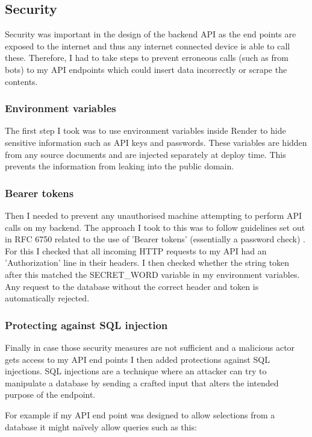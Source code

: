 \subsection{Security}

Security was important in the design of the backend API as the end points are
exposed to the internet and thus any internet connected device is able to call
these. Therefore, I had to take steps to prevent erroneous calls (such as from
bots) to my API endpoints which could insert data incorrectly or scrape the
contents.

\subsubsection{Environment variables}
The first step I took was to use environment variables inside Render to hide
sensitive information such as API keys and passwords. These variables are hidden
from any source documents and are injected separately at deploy time. This
prevents the information from leaking into the public domain.

\subsubsection{Bearer tokens}
Then I needed to prevent any unauthorised machine attempting to perform API
calls on my backend. The approach I took to this was to follow guidelines set
out in RFC 6750 related to the use of 'Bearer tokens' (essentially a password
check) \cite{rfc6750}. For this I checked that all incoming HTTP requests to my
API had an 'Authorization' line in their headers. I then checked whether the
string token after this matched the SECRET\_WORD variable in my environment
variables. Any request to the database without the correct header and token is
automatically rejected.

\subsubsection{Protecting against SQL injection}
Finally in case those security measures are not sufficient and a malicious actor
gets access to my API end points I then added protections against SQL
injections. SQL injections are a technique where an attacker can try to
manipulate a database by sending a crafted input that alters the intended
purpose of the endpoint.

For example if my API end point was designed to allow selections from a database
it might naïvely allow queries such as this:


